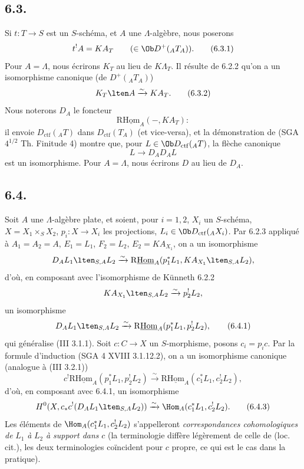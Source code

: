\subsection*{6.3.}
Si $t:T\to S$ est un $S$-schéma, et $A$ une $\Lambda$-algèbre, nous poserons
\begin{equation}
t^!A = KA_T \qquad(\in\Ob D^+({}_AT_A)).
\tag{6.3.1}
\end{equation}
Pour $A=\Lambda$, nous écrirons $K_T$ au lieu de $K\Lambda_T$. Il résulte de 6.2.2 qu'on a un isomorphisme canonique (de $D^+({}_AT_A)$)
\begin{equation}
K_T\lten A\xrightarrow{\sim}KA_T.
\tag{6.3.2}
\end{equation}
Nous noterons $D_A$ le foncteur
\[
\mathrm{R}\underline{\mathrm{Hom}}_A(-,KA_T) :
\]
il envoie $D_{\mathrm{ctf}}({}_AT)$ dans $D_{\mathrm{ctf}}(T_A)$ (et vice-versa), et la démonstration de (SGA $4^{1/2}$ Th. Finitude 4) montre que, pour $L\in\Ob D_{\mathrm{ctf}}({}_AT)$, la flèche canonique
\[
L\longrightarrow D_AD_AL
\]
est un isomorphisme. Pour $A=\Lambda$, nous écrirons $D$ au lieu de $D_A$.

\subsection*{6.4.}
Soit $A$ une $\Lambda$-algèbre plate, et soient, pour $i=1,2$, $X_i$ un $S$-schéma, $X=X_1\times_SX_2$, $p_i:X\to X_i$ les projections, $L_i\in\Ob D_{\mathrm{ctf}}({}_AX_i)$. Par 6.2.3 appliqué à $A_1=A_2=A$, $E_1=L_1$, $F_2=L_2$, $E_2=KA_{X_1}$, on a un isomorphisme
\[
D_A L_1\lten_{S,A}L_2
\xrightarrow{\sim}
\mathrm{R}\underline{\mathrm{Hom}}_A(p_1^*L_1,KA_{X_1}\lten_{S,A}L_2),
\]
d'où, en composant avec l'isomorphisme de Künneth 6.2.2
\[
KA_{X_1}\lten_{S,A}L_2\xrightarrow{\sim}p_2^!L_2,
\]
un isomorphisme
\begin{equation}
D_AL_1\lten_{S,A}L_2
\xrightarrow{\sim}
\mathrm{R}\underline{\mathrm{Hom}}_A(p_1^*L_1,p_2^!L_2),
\tag{6.4.1}
\end{equation}
qui généralise (III 3.1.1). Soit $c:C\to X$ un $S$-morphisme, posons $c_i=p_ic$. Par la formule d'induction (SGA 4 XVIII 3.1.12.2), on a un isomorphisme canonique (analogue à (III 3.2.1))
\begin{equation}
c^!\mathrm{R}\underline{\mathrm{Hom}}_A(p_1^*L_1,p_2^!L_2)
\xrightarrow{\sim}
\mathrm{R}\underline{\mathrm{Hom}}_A(c_1^*L_1,c_2^!L_2),
\tag{6.4.2}
\end{equation}
d'où, en composant avec 6.4.1, un isomorphisme
\begin{equation}
H^0(X,c_*c^!(D_AL_1\lten_{S,A}L_2))
\xrightarrow{\sim}
\Hom_A(c_1^*L_1,c_2^!L_2).
\tag{6.4.3}
\end{equation}
Les éléments de $\Hom_A(c_1^*L_1,c_2^!L_2)$ s'appelleront \emph{correspondances cohomologiques de} $L_1$ \emph{à} $L_2$ \emph{à support dans} $c$ (la terminologie diffère légèrement de celle de (loc. cit.), les deux terminologies coïncident pour $c$ propre, ce qui est le cas dans la pratique).

